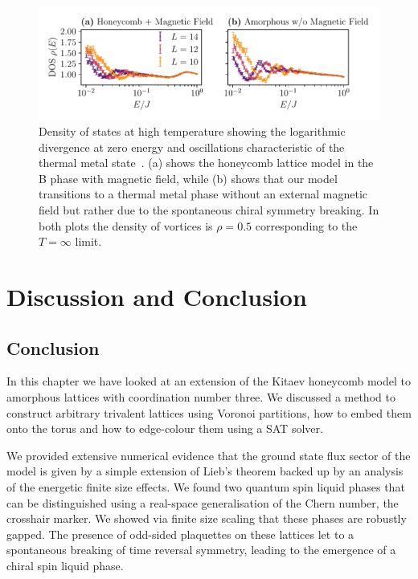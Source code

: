 \hypertarget{fig:DOS_oscillations}{%
\begin{figure}
\centering
\includegraphics[width=1\textwidth,height=\textheight]{figure_code/amk_chapter/results/DOS_oscillations/DOS_oscillations}
\caption[{Distinctive Oscillations in the Density of States}]{Density of states at high temperature showing the logarithmic divergence at zero energy and oscillations characteristic of the thermal metal state~\autocite{bocquet_disordered_2000,selfThermallyInducedMetallic2019}. (a) shows the honeycomb lattice model in the B phase with magnetic field, while (b) shows that our model transitions to a thermal metal phase without an external magnetic field but rather due to the spontaneous chiral symmetry breaking. In both plots the density of vortices is \(\rho = 0.5\) corresponding to the \(T = \infty\) limit.}
\label{fig:DOS_oscillations}
\end{figure}
}

\hypertarget{sec:AMK-Conclusion}{%
\section{Discussion and Conclusion}\label{sec:AMK-Conclusion}}

\hypertarget{conclusion}{%
\subsection{Conclusion}\label{conclusion}}

In this chapter we have looked at an extension of the Kitaev honeycomb model to amorphous lattices with coordination number three. We discussed a method to construct arbitrary trivalent lattices using Voronoi partitions, how to embed them onto the torus and how to edge-colour them using a SAT solver.

We provided extensive numerical evidence that the ground state flux sector of the model is given by a simple extension of Lieb's theorem backed up by an analysis of the energetic finite size effects. We found two quantum spin liquid phases that can be distinguished using a real-space generalisation of the Chern number, the crosshair marker. We showed via finite size scaling that these phases are robustly gapped. The presence of odd-sided plaquettes on these lattices let to a spontaneous breaking of time reversal symmetry, leading to the emergence of a chiral spin liquid phase.

